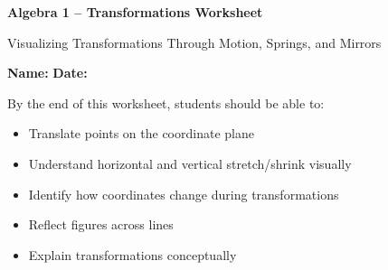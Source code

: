 \documentclass[11pt]{article}
\begin{document}

\begin{center}
    {\Huge \textbf{Algebra 1 -- Transformations Worksheet}}
\end{center}

\vspace{0.2cm}

\begin{center}
\Large
Visualizing Transformations Through Motion, Springs, and Mirrors
\end{center}

\vspace{0.4cm}

\noindent
\textbf{Name:} \underline{\hspace{5cm}}
\hfill
\textbf{Date:} \underline{\hspace{3cm}}

\vspace{0.5cm}


\begin{tcolorbox}[
colback=gray!5,
colframe=black,
title=\Large Learning Goals
]

By the end of this worksheet, students should be able to:

\begin{itemize}

\item Translate points on the coordinate plane

\item Understand horizontal and vertical stretch/shrink visually

\item Identify how coordinates change during transformations

\item Reflect figures across lines

\item Explain transformations conceptually

\end{itemize}

\end{tcolorbox}

\vspace{0.5cm}

\end{document}
